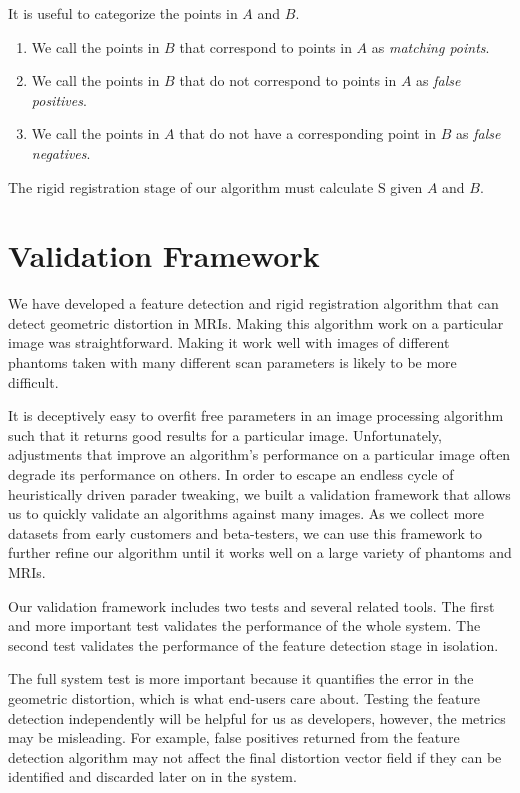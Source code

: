 \documentclass[12pt]{article}
\begin{document}
It is useful to categorize the points in $A$ and $B$.

\begin{enumerate}
    \item We call the points in $B$ that correspond to points in $A$ as \textit{matching points}.
    \item We call the points in $B$ that do not correspond to points in $A$ as \textit{false positives}.
    \item We call the points in $A$ that do not have a corresponding point in $B$ as \textit{false negatives}.
\end{enumerate}

The rigid registration stage of our algorithm must calculate $\textrm{S}$ given $A$ and $B$.

\section{Validation Framework}

We have developed a feature detection and rigid registration algorithm that can detect geometric distortion in MRIs.  Making this algorithm work on a particular image was straightforward.  Making it work well with images of different phantoms taken with many different scan parameters is likely to be more difficult.

It is deceptively easy to overfit free parameters in an image processing algorithm such that it returns good results for a particular image.  Unfortunately, adjustments that improve an algorithm's performance on a particular image often degrade its performance on others.  In order to escape an endless cycle of heuristically driven parader tweaking, we built a validation framework that allows us to quickly validate an algorithms against many images.  As we collect more datasets from early customers and beta-testers, we can use this framework to further refine our algorithm until it works well on a large variety of phantoms and MRIs.

Our validation framework includes two tests and several related tools.  The first and more important test validates the performance of the whole system.  The second test validates the performance of the feature detection stage in isolation.

The full system test is more important because it quantifies the error in the geometric distortion, which is what end-users care about.  Testing the feature detection independently will be helpful for us as developers, however, the metrics may be misleading.  For example, false positives returned from the feature detection algorithm may not affect the final distortion vector field if they can be identified and discarded later on in the system.
\end{document}
